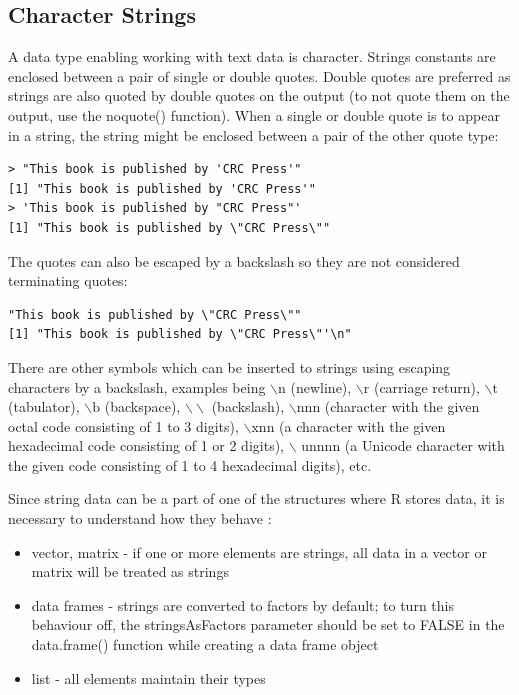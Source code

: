 \documentclass[11pt,openany,executivepaper]{book}
\begin{document}
\subsection{Character Strings}
A data type enabling working with text data is character. Strings constants are enclosed between a pair of single or double quotes. Double quotes are preferred as strings are also quoted by double quotes on the output (to not quote them on the output, use the noquote() function). When a single or double quote is to appear in a string, the string might be enclosed between a pair of the other quote type:

\begin{verbatim}
> "This book is published by 'CRC Press'"
[1] "This book is published by 'CRC Press'"
> 'This book is published by "CRC Press"'
[1] "This book is published by \"CRC Press\""
\end{verbatim}

The quotes can also be escaped by a backslash so they are not considered terminating quotes:

\begin{verbatim}
"This book is published by \"CRC Press\""
[1] "This book is published by \"CRC Press\"'\n"
\end{verbatim}

There are other symbols which can be inserted to strings using escaping characters by a backslash, examples being $\backslash \mathrm{n}$ (newline), $\backslash \mathrm{r}$ (carriage return), $\backslash \mathrm{t}$ (tabulator), $\backslash \mathrm{b}$ (backspace), $\backslash \backslash$ (backslash), $\backslash \mathrm{nnn}$ (character with the given octal code consisting of 1 to 3 digits), $\backslash \mathrm{xnn}$ (a character with the given hexadecimal code consisting of 1 or 2 digits), $\backslash$ unnnn (a Unicode character with the given code consisting of 1 to 4 hexadecimal digits), etc.

Since string data can be a part of one of the structures where R stores data, it is necessary to understand how they behave \cite{237}:

\begin{itemize}
  \item vector, matrix - if one or more elements are strings, all data in a vector or matrix will be treated as strings
  \item data frames - strings are converted to factors by default; to turn this behaviour off, the stringsAsFactors parameter should be set to FALSE in the data.frame() function while creating a data frame object
  \item list - all elements maintain their types
\end{itemize}
\end{document}
